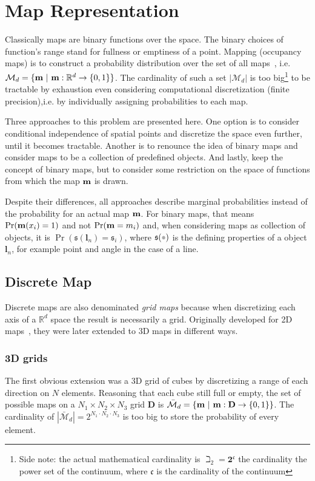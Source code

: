 \section{Map Representation}
\label{s:map_rep}
Classically maps are binary functions over the space. The binary choices of
function's range stand for fullness or emptiness of a point.
Mapping (occupancy maps) is to construct a probability distribution over the set
of all maps~\cite{thrunprob}, i.e.
$\mathcal{M}_d=\{\mathrm{\mathbf{m}}~|~\mathrm{\mathbf{m}}:\mathbb{R}^d\to\{0,1\}\}$. The
cardinality of such a set $|\mathcal{M}_d|$ is too big\footnote{Side note: the
actual mathematical cardinality is $\beth_2=\mathbf{2}^\mathfrak{c}$ the
cardinality the power set of the continuum, where $\mathfrak{c}$ is the
cardinality of the continuum } to be tractable by exhaustion even considering
computational discretization (finite precision),i.e. by individually
assigning probabilities to each map.

Three approaches to this problem are presented here. One option is to consider
conditional independence of spatial points and discretize the space even
further, until it becomes tractable.
Another is to renounce the idea of binary maps and consider maps to be a collection of predefined
objects. And lastly, keep the concept of binary maps, but to consider some
restriction on the space of functions from which the map $\mathrm{\mathbf{m}}$ is drawn.

Despite their differences, all approaches describe marginal probabilities
instead of the probability for an actual map $\mathrm{\mathbf{m}}$. For binary maps,
that means $\Pr(\mathrm{\mathbf{m}}(x_i)=1)$ and not $\Pr(\mathrm{\mathbf{m}}=m_i)$ and, when
considering maps as collection of objects, it is
$\Pr(\mathfrak{s}(\mathbf{l}_n)=\mathfrak{s}_i)$, where $\mathfrak{s}(\parm)$ is
the defining properties of a object $\mathbf{l}_n$, for example point and angle
in the case of a line.

\subsection{Discrete Map}

Discrete maps are also denominated \textit{grid maps} because when discretizing
each axis of a $\mathbb{R}^d$ space the result is necessarily a grid. Originally
developed for 2D maps~\cite{thrunprob}, they were later extended to 3D maps
in different ways.

\subsubsection{3D grids}
\label{sss:3dgrid}
The first obvious extension was a 3D grid of cubes by discretizing a range
of each direction on $N$ elements. Reasoning that each cube still full
or empty, the set of possible maps on a $N_1\times N_2\times
N_3$ grid $\mathbf{D}$ is
$\bar{\mathcal{M}}_d=\{\mathrm{\mathbf{m}}~|~\mathrm{\mathbf{m}}:\mathbf{D}\to\{0,1\}\}$. The
cardinality of $|\bar{\mathcal{M}}_d|=2^{N_1\cdot N_2\cdot
N_3}$ is too big to store the probability of every element. 

